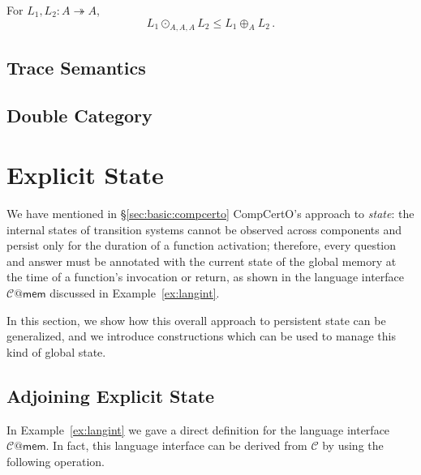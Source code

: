 \documentclass[acmsmall,screen,review,anonymous]{acmart}
\newcommand{\kw}[1]{\ensuremath{ \mathsf{#1} }}
\begin{document}
\begin{theorem}
For $L_1, L_2 : A \twoheadrightarrow A$,
\[
  L_1 \odot_{A,A,A} L_2
  \le
  L_1 \oplus_A L_2
 \,.
\]
\end{theorem}


\subsection{Trace Semantics} \label{sec:basic:coh} %


\subsection{Double Category} \label{sec:basic:double} %



\section{Explicit State} %

We have mentioned in \S\ref{sec:basic:compcerto}
CompCertO's approach to \emph{state}:
the internal states of transition systems
cannot be observed across components and
persist only for the duration of a function activation;
therefore,
every question and answer must be annotated with
the current state of the global memory
at the time of a function's invocation or return,
as shown in the language interface $\mathcal{C}@\kw{mem}$
discussed in Example~\ref{ex:langint}.

In this section,
we show how this overall approach to persistent state
can be generalized,
and we introduce constructions
which can be used to manage
this kind of global state.

\subsection{Adjoining Explicit State} \label{sec:basic:state} %


In Example~\ref{ex:langint} we gave a direct definition
for the language interface $\mathcal{C}@\kw{mem}$.
In fact,
this language interface can be derived from $\mathcal{C}$
by using the following operation.
\end{document}
